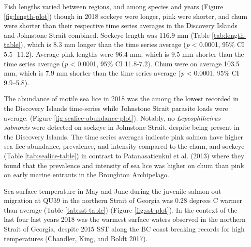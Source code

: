 \documentclass[fleqn,10pt]{wlpeerj} %
\begin{document}
Fish lengths varied between regions, and among species and years (Figure \ref{fig:length-plot}) though in 2018 sockeye were longer, pink were shorter, and chum were shorter than their respective time series averages in the Discovery Islands and Johnstone Strait combined. Sockeye length was 116.9 mm (Table \ref{tab:length-table}), which is 8.3 mm longer than the time series average (\emph{p} \textless{} 0.0001, 95\% CI 5.5 -11.2). Average pink lengths were 96.4 mm, which is 9.5 mm shorter than the time series average (\emph{p} \textless{} 0.0001, 95\% CI 11.8-7.2). Chum were on average 103.5 mm, which is 7.9 mm shorter than the time series average (\emph{p} \textless{} 0.0001, 95\% CI 9.9--5.8).

The abundance of motile sea lice in 2018 was the among the lowest recorded in the Discovery Islands time-series while Johnstone Strait parasite loads were average. (Figure \ref{fig:sealice-abundance-plot}). Notably, no \emph{Lepeophtheirus salmonis} were detected on sockeye in Johnstone Strait, despite being present in the Discovery Islands. The time series averages indicate pink salmon have higher sea lice abundance, prevalence, and intensity compared to the chum, and sockeye (Table \ref{tab:sealice-table}) in contrast to Patanasatienkul et al. (2013) where they found that the prevalence and intensity of sea lice was higher on chum than pink on early marine entrants in the Broughton Archipelago.

Sea-surface temperature in May and June during the juvenile salmon out-migration at QU39 in the northern Strait of Georgia was 0.28 degrees C warmer than average (Table \ref{tab:sst-table}) (Figure \ref{fig:sst-plot}). In the context of the last four last years 2018 was the warmest surface waters observed in the northern Strait of Georgia, despite 2015 SST along the BC coast breaking records for high temperatures (Chandler, King, and Boldt 2017).
\end{document}
